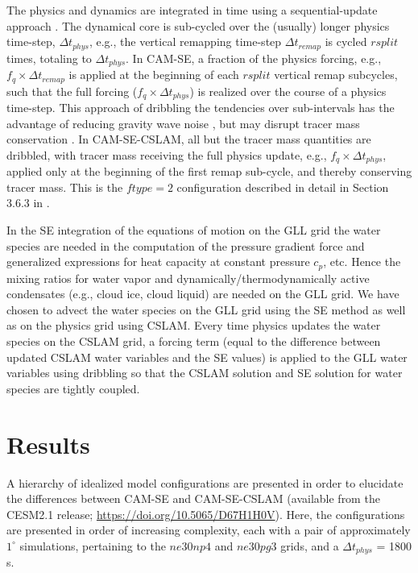 \documentclass[twocol]{ametsoc}
\begin{document}
{\color{red}The physics and dynamics are integrated in time using a sequential-update approach \citep[e.g.,][]{W2002MWR}. The dynamical core is sub-cycled over the (usually) longer physics time-step, $\Delta t_{phys}$, e.g., the vertical remapping time-step $\Delta t_{remap}$ is cycled $rsplit$ times, totaling to $\Delta t_{phys}$. In CAM-SE, a fraction of the physics forcing, e.g., $f_q \times \Delta t_{remap}$ is applied at the beginning of each $rsplit$ vertical remap subcycles, such that the full forcing ($f_q \times \Delta t_{phys}$) is realized over the course of a physics time-step. This approach of dribbling the tendencies over sub-intervals has the advantage of reducing gravity wave noise \citep{TJ2016GMD}, but may disrupt tracer mass conservation \citep{water-leak}. In CAM-SE-CSLAM, all but the tracer mass quantities are dribbled, with tracer mass receiving the full physics update, e.g., $f_q \times \Delta t_{phys}$, applied only at the beginning of the first remap sub-cycle, and thereby conserving tracer mass. This is the $ftype=2$ configuration described in detail in Section 3.6.3 in \cite{LetAl2018JAMES}.

In the SE integration of the equations of motion on the GLL grid the water species are needed in the computation of the pressure gradient force and generalized expressions for heat capacity at constant pressure $c_p$, etc. Hence the mixing ratios for water vapor and dynamically/thermodynamically active condensates (e.g., cloud ice, cloud liquid) are needed on the GLL grid. We have chosen to advect the water species on the GLL grid using the SE method as well as on the physics grid using CSLAM. Every time physics updates the water species on the CSLAM grid, a forcing term (equal to the difference between updated CSLAM water variables and the SE values) is applied to the GLL water variables using dribbling so that the CSLAM solution and SE solution for water species are tightly coupled. 
}

\section{Results}\label{sec:results}

{\color{red}A hierarchy of idealized model configurations are presented in order to elucidate the differences between CAM-SE and CAM-SE-CSLAM (available from the CESM2.1 release; \url{https://doi.org/10.5065/D67H1H0V}). Here, the configurations are presented in order of increasing complexity, each with a pair of approximately $1^{\circ}$ simulations, pertaining to the $ne30np4$ and $ne30pg3$ grids, and a $\Delta t_{phys}$ = 1800 s.{}}
\end{document}
